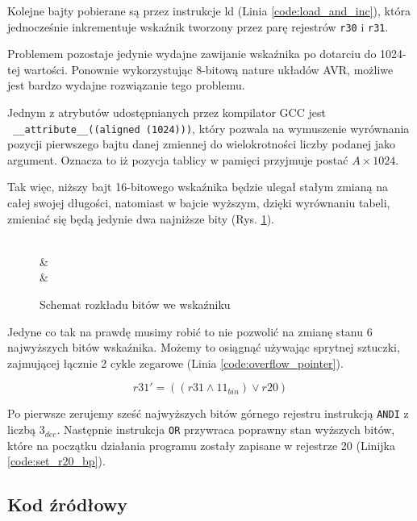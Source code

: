 \documentclass[12pt, a4paper]{article}
\begin{document}
Kolejne bajty pobierane są przez instrukcje ld (Linia \ref{code:load_and_inc}), która jednocześnie
inkrementuje wskaźnik tworzony przez parę rejestrów \verb|r30| i \verb|r31|.

Problemem pozostaje jedynie wydajne zawijanie wskaźnika po dotarciu do 1024-tej wartości.
Ponownie wykorzystując 8-bitową nature układów AVR, możliwe jest bardzo wydajne rozwiązanie tego problemu.

Jednym z atrybutów udostępnianych przez kompilator GCC jest\\
\verb| __attribute__((aligned (1024)))|, który pozwala na wymuszenie
wyrównania pozycji pierwszego bajtu danej zmiennej do wielokrotności liczby podanej jako argument.
Oznacza to iż pozycja tablicy w pamięci przyjmuje postać $A \times 1024$.

Tak więc, niższy bajt 16-bitowego wskaźnika będzie ulegał stałym zmianą na całej swojej długości,
natomiast w bajcie wyższym, dzięki wyrównaniu tabeli, zmieniać się będą jedynie dwa najniższe bity (Rys. \ref{fig:bits_ex}).

\begin{figure}[h]
	\centering
	\hfill

	\begin{bytefield}[bitwidth=7mm,endianness=big]{16}
		 \\
		 & \\
		 & \\
	\end{bytefield}
	\caption{Schemat rozkładu bitów we wskaźniku}
	\label{fig:bits_ex}
\end{figure}

Jedyne co tak na prawdę musimy robić to nie pozwolić na zmianę stanu 6 najwyższych bitów wskaźnika.
Możemy to osiągnąć używając sprytnej sztuczki, zajmującej łącznie 2 cykle zegarowe (Linia \ref{code:overflow_pointer}).

\begin{equation}
	r31' = \left( \left( r31 \land 11_{bin} \right) \lor r20 \right)
\end{equation}

Po pierwsze zerujemy sześć najwyższych bitów górnego rejestru instrukcją \verb|ANDI| z liczbą $3_{dec}$.
Następnie instrukcja \verb|OR| przywraca poprawny stan wyższych bitów, 
które na początku działania programu zostały zapisane w rejestrze 20 (Linijka \ref{code:set_r20_bp}).

\subsection{Kod źródłowy}
\end{document}
